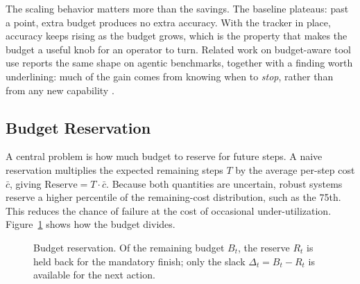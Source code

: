 \documentclass[11pt]{book}
\begin{document}
The scaling behavior matters more than the savings. The baseline plateaus: past a point, extra budget produces no extra accuracy. With the tracker in place, accuracy keeps rising as the budget grows, which is the property that makes the budget a useful knob for an operator to turn. Related work on budget-aware tool use reports the same shape on agentic benchmarks, together with a finding worth underlining: much of the gain comes from knowing when to \textit{stop}, rather than from any new capability \cite{budgettooluse2026}.

\subsection{Budget Reservation}

A central problem is how much budget to reserve for future steps. A naive reservation multiplies the expected remaining steps $T$ by the average per-step cost $\bar{c}$, giving $\text{Reserve} = T \cdot \bar{c}$. Because both quantities are uncertain, robust systems reserve a higher percentile of the remaining-cost distribution, such as the 75th. This reduces the chance of failure at the cost of occasional under-utilization. Figure~\ref{fig:reservation} shows how the budget divides.

\begin{figure}[htbp]
\centering
{}
\caption{Budget reservation. Of the remaining budget $B_t$, the reserve $R_t$ is held back for the mandatory finish; only the slack $\Delta_t = B_t - R_t$ is available for the next action.}
\label{fig:reservation}
\end{figure}
\end{document}
